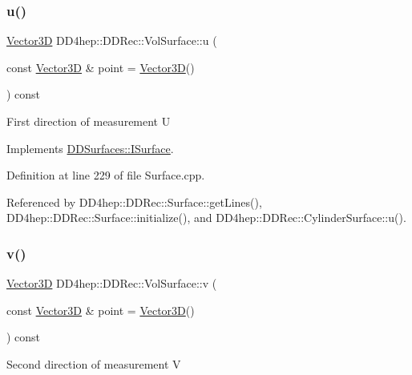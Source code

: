 \subsubsection{\texorpdfstring{u()}{u()}}
{\footnotesize\ttfamily \hyperlink{class_d_d_surfaces_1_1_vector3_d}{Vector3D} D\+D4hep\+::\+D\+D\+Rec\+::\+Vol\+Surface\+::u (\begin{DoxyParamCaption}\item[{const \hyperlink{class_d_d_surfaces_1_1_vector3_d}{Vector3D} \&}]{point = {\ttfamily \hyperlink{class_d_d_surfaces_1_1_vector3_d}{Vector3D}()} }\end{DoxyParamCaption}) const\hspace{0.3cm}{\ttfamily [virtual]}}

First direction of measurement U 

Implements \hyperlink{class_d_d_surfaces_1_1_i_surface_a09fd4aa43cc96d50b4b81b94107f7d8f}{D\+D\+Surfaces\+::\+I\+Surface}.



Definition at line 229 of file Surface.\+cpp.



Referenced by D\+D4hep\+::\+D\+D\+Rec\+::\+Surface\+::get\+Lines(), D\+D4hep\+::\+D\+D\+Rec\+::\+Surface\+::initialize(), and D\+D4hep\+::\+D\+D\+Rec\+::\+Cylinder\+Surface\+::u().

\hypertarget{class_d_d4hep_1_1_d_d_rec_1_1_vol_surface_a58966cabf7965016fcb63414b64eedd2}{}\label{class_d_d4hep_1_1_d_d_rec_1_1_vol_surface_a58966cabf7965016fcb63414b64eedd2} 
\subsubsection{\texorpdfstring{v()}{v()}}
{\footnotesize\ttfamily \hyperlink{class_d_d_surfaces_1_1_vector3_d}{Vector3D} D\+D4hep\+::\+D\+D\+Rec\+::\+Vol\+Surface\+::v (\begin{DoxyParamCaption}\item[{const \hyperlink{class_d_d_surfaces_1_1_vector3_d}{Vector3D} \&}]{point = {\ttfamily \hyperlink{class_d_d_surfaces_1_1_vector3_d}{Vector3D}()} }\end{DoxyParamCaption}) const\hspace{0.3cm}{\ttfamily [virtual]}}

Second direction of measurement V 

